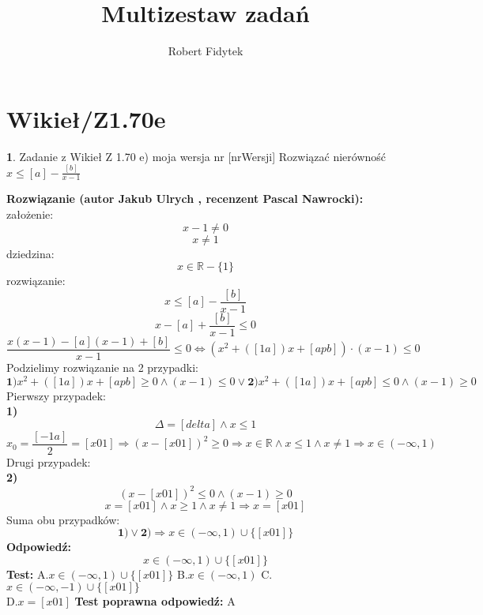 \documentclass[12pt, a4paper]{article}
\title{Multizestaw zadań}
\author{Robert Fidytek}
\date{}
\theoremstyle{definition} %
\newtheorem{zad}{}
\newcommand{\kategoria}[1]{\section{#1}} %
\newcommand{\zadStart}[1]{\begin{zad}#1\newline} %
\newcommand{\zadStop}{\end{zad}}   %
\newcommand{\rozwStart}[2]{\noindent \textbf{Rozwiązanie (autor #1 , recenzent #2): }\newline} %
\newcommand{\rozwStop}{\newline}                                            %
\newcommand{\odpStart}{\noindent \textbf{Odpowiedź:}\newline}    %
\newcommand{\odpStop}{\newline}                                             %
\newcommand{\testStart}{\noindent \textbf{Test:}\newline} %
\newcommand{\testStop}{\newline} %
\newcommand{\kluczStart}{\noindent \textbf{Test poprawna odpowiedź:}\newline} %
\newcommand{\kluczStop}{\newline} %
\begin{document}
\maketitle


\kategoria{Wikieł/Z1.70e}
\zadStart{Zadanie z Wikieł Z 1.70 e) moja wersja nr [nrWersji]}
Rozwiązać nierówność $x\leq[a]-\frac{[b]}{x-1}$
\zadStop
\rozwStart{Jakub Ulrych}{Pascal Nawrocki}
założenie: $$x-1\neq0$$
$$x\neq1$$
dziedzina:$$x\in \mathbb{R}-\{1\}$$
rozwiązanie:$$x\leq[a]-\frac{[b]}{x-1}$$
$$x-[a]+\frac{[b]}{x-1}\leq0$$
$$\frac{x(x-1)-[a](x-1)+[b]}{x-1}\leq0\Leftrightarrow (x^{2}+([1a])x+[apb])\cdot(x-1)\leq0$$
Podzielimy rozwiązanie na 2 przypadki:
$$\textbf{1)}x^{2}+([1a])x+[apb]\geq0 \land (x-1)\leq0 \vee \textbf{2)}x^{2}+([1a])x+[apb]\leq0 \land (x-1)\geq0$$
Pierwszy przypadek:\\
\textbf{1)}
$$\Delta=[delta] \land x\leq1$$
$$x_{0}=\frac{[-1a]}{2}=[x01]\Rightarrow(x-[x01])^{2}\geq0\Rightarrow x\in \mathbb{R} \land x\leq1 \land x\neq1\Rightarrow x\in(-\infty,1)$$
Drugi przypadek:\\
\textbf{2)}
$$(x-[x01])^{2}\leq0 \land (x-1)\geq0$$
$$x=[x01] \land x\geq1 \land x\neq1\Rightarrow x=[x01]$$
Suma obu przypadków:
$$\textbf{1)}\vee\textbf{2)}\Rightarrow x\in(-\infty,1)\cup\{[x01]\}$$
\rozwStop
\odpStart
$$x\in(-\infty,1)\cup\{[x01]\}$$
\odpStop
\testStart
A.$x\in(-\infty,1)\cup\{[x01]\}$
B.$x\in(-\infty,1)$
C.$x\in(-\infty,-1)\cup\{[x01]\}$\\
D.$x=[x01]$
\testStop
\kluczStart
A
\kluczStop
\end{document}

